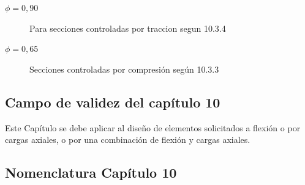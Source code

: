 \documentclass[twocolumn]{article}
\begin{document}
\begin{description}
	\item[$\phi = 0,90$] Para secciones controladas por traccion segun 10.3.4
	\item[$\phi=0,65$] Secciones controladas por compresión según 10.3.3
\end{description}


\subsection*{Campo de validez del capítulo 10}
Este Capítulo se debe aplicar al diseño de elementos solicitados a flexión o por cargas axiales, o por una combinación de flexión y cargas axiales.
\subsection{Nomenclatura Capítulo 10}
\end{document}
